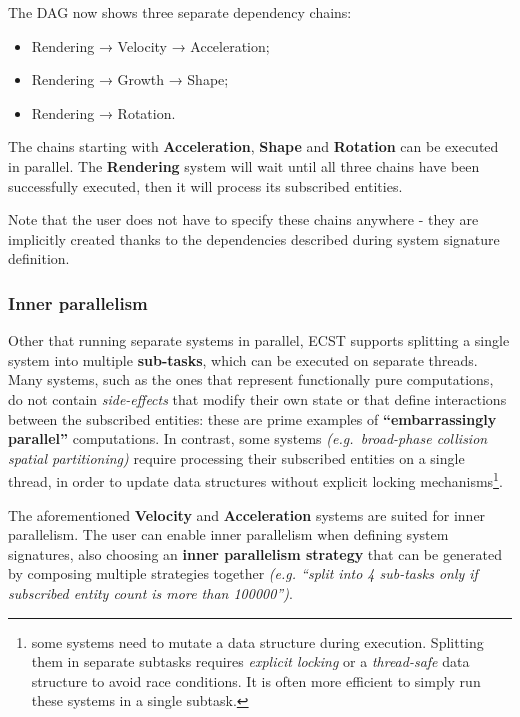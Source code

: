 \documentclass[oneside, 12pt, a4paper, openany]{book}
\begin{document}
The DAG now shows three separate dependency chains:

\begin{itemize}
\item
  Rendering → Velocity → Acceleration;
\item
  Rendering → Growth → Shape;
\item
  Rendering → Rotation.
\end{itemize}

The chains starting with \textbf{Acceleration}, \textbf{Shape} and
\textbf{Rotation} can be executed in parallel. The \textbf{Rendering}
system will wait until all three chains have been successfully executed,
then it will process its subscribed entities.

Note that the user does not have to specify these chains anywhere - they
are implicitly created thanks to the dependencies described during
system signature definition.

\subsubsection{Inner parallelism}\label{inner-parallelism}

Other that running separate systems in parallel, ECST supports splitting
a single system into multiple \textbf{sub-tasks}, which can be executed
on separate threads. Many systems, such as the ones that represent
functionally pure computations, do not contain \emph{side-effects} that
modify their own state or that define interactions between the
subscribed entities: these are prime examples of
\textbf{``embarrassingly parallel''} computations. In contrast, some
systems \emph{(e.g.~broad-phase collision spatial partitioning)} require
processing their subscribed entities on a single thread, in order to
update data structures without explicit locking mechanisms\footnote{some
  systems need to mutate a data structure during execution. Splitting
  them in separate subtasks requires \emph{explicit locking} or a
  \emph{thread-safe} data structure to avoid race conditions. It is
  often more efficient to simply run these systems in a single subtask.}.

The aforementioned \textbf{Velocity} and \textbf{Acceleration} systems
are suited for inner parallelism. The user can enable inner parallelism
when defining system signatures, also choosing an \textbf{inner
parallelism strategy} that can be generated by composing multiple
strategies together \emph{(e.g. ``split into 4 sub-tasks only if
subscribed entity count is more than 100000'')}.
\end{document}
